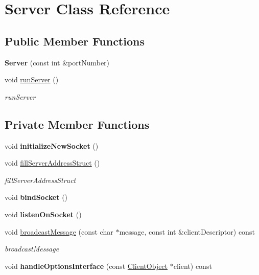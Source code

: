 \hypertarget{classServer}{}\section{Server Class Reference}
\label{classServer}
\subsection*{Public Member Functions}
\begin{DoxyCompactItemize}
\item 
\mbox{\label{classServer_a1a3d683f763e9a89a8f3a001404332e0}} 
{\bfseries Server} (const int \&port\+Number)
\item 
void \hyperlink{classServer_a5dfdd750d32aa4adbb4fdd8ba29b1224}{run\+Server} ()
\begin{DoxyCompactList}\small\item\em run\+Server \end{DoxyCompactList}\end{DoxyCompactItemize}
\subsection*{Private Member Functions}
\begin{DoxyCompactItemize}
\item 
\mbox{\label{classServer_ac47f99e1f4ab05e3d67b213514caf748}} 
void {\bfseries initialize\+New\+Socket} ()
\item 
void \hyperlink{classServer_a684bf0fce1ec62711a60d0cc3d25e8f8}{fill\+Server\+Address\+Struct} ()
\begin{DoxyCompactList}\small\item\em fill\+Server\+Address\+Struct \end{DoxyCompactList}\item 
\mbox{\label{classServer_a8d86edf1df9f12df07dc6e949d70f77f}} 
void {\bfseries bind\+Socket} ()
\item 
\mbox{\label{classServer_ab021d8bdec2e65ef97537b9542e946a2}} 
void {\bfseries listen\+On\+Socket} ()
\item 
void \hyperlink{classServer_a7153ea97c1112ae9dc61c65dc59c7f82}{broadcast\+Message} (const char $\ast$message, const int \&client\+Descriptor) const
\begin{DoxyCompactList}\small\item\em broadcast\+Message \end{DoxyCompactList}\item 
\mbox{\label{classServer_a24de25ecc28d8e0202a09c0ae5f7e98f}} 
void {\bfseries handle\+Options\+Interface} (const \hyperlink{classClientObject}{Client\+Object} $\ast$client) const
\end{DoxyCompactItemize}
